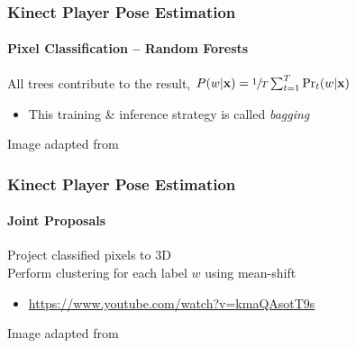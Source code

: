 \documentclass[xetex,professionalfont]{beamer}
\renewcommand{\vec}[1]{\ensuremath{\mathbf{#1}}}
\newcommand{\vx}{\vec{x}}
\begin{document}

\begin{frame}
\frametitle{Kinect Player Pose Estimation}
\framesubtitle{Pixel Classification -- Random Forests}

All trees contribute to the result, $P(w|\vx)=\sfrac{1}{T}\sum_{t=1}^T \Pr_t(w|\vx)$
\begin{itemize}
    \item This training \& inference strategy is called \emph{bagging} %
\end{itemize}

\bigskip
\begin{center}
    {\centering Image adapted from \cite{shotton2011}}
\end{center}

\end{frame}


\begin{frame}
\frametitle{Kinect Player Pose Estimation}
\framesubtitle{Joint Proposals}

Project classified pixels to 3D\\\medskip
Perform clustering for each label $w$ using mean-shift %
\begin{itemize}
    \item \url{https://www.youtube.com/watch?v=kmaQAsotT9s}
\end{itemize}

\bigskip
\begin{center}
    {\centering Image adapted from \cite{shotton2011}}
\end{center}

\end{frame}
\end{document}
